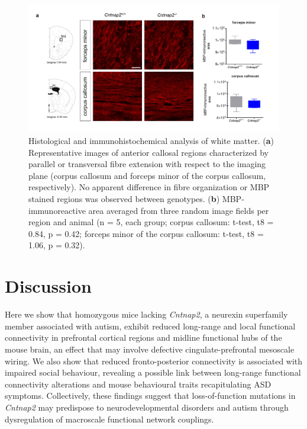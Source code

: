 \begin{figure}[th] 
    \centering
    \includegraphics[scale=0.5]{figures/cntnap2_figure_s8.png}
    \decoRule
    \caption[Histological and immunohistochemical analysis of white
    matter.]{Histological and immunohistochemical analysis of white matter.
    (\textbf{a}) Representative images of anterior callosal regions
    characterized by parallel or transversal fibre extension with respect to the
    imaging plane (corpus callosum and forceps minor of the corpus callosum,
    respectively). No apparent difference in fibre organization or MBP stained
    regions was observed between genotypes. (\textbf{b}) MBP-immunoreactive area
    averaged from three random image fields per region and animal (n = 5, each
    group; corpus callosum: t-test, t8 = 0.84, p = 0.42; forceps minor of the
    corpus callosum: t-test, t8 = 1.06, p = 0.32).}
    \label{fig:cntnap2_figs8}
\end{figure}

\section{Discussion}

Here we show that homozygous mice lacking \textit{Cntnap2}, a neurexin superfamily member
associated with autism, exhibit reduced long-range and local functional
connectivity in prefrontal cortical regions and midline functional hubs of the
mouse brain, an effect that may involve defective cingulate-prefrontal mesoscale
wiring. We also show that reduced fronto-posterior connectivity is associated
with impaired social behaviour, revealing a possible link between long-range
functional connectivity alterations and mouse behavioural traits recapitulating
ASD symptoms. Collectively, these findings suggest that loss-of-function
mutations in \textit{Cntnap2} may predispose to neurodevelopmental disorders and autism
through dysregulation of macroscale functional network couplings.

